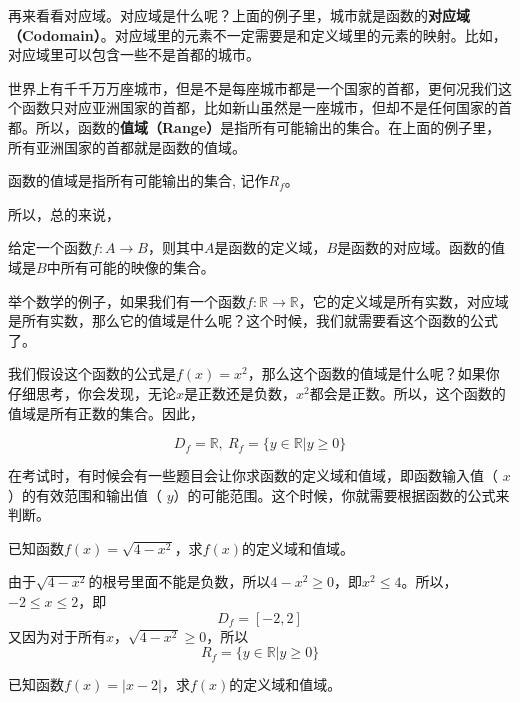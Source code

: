 \documentclass[UTF8]{ctexart}
\makeatletter
\newenvironment{cequation}{
    \makeatletter
    \setbool{@fleqn}{false}
    \makeatother
    \begin{equation*}
        }{\end{equation*}}
\makeatother
\begin{document}
再来看看对应域。对应域是什么呢？上面的例子里，城市就是函数的\textbf{对应域（Codomain）}。对应域里的元素不一定需要是和定义域里的元素的映射。比如，对应域里可以包含一些不是首都的城市。

世界上有千千万万座城市，但是不是每座城市都是一个国家的首都，更何况我们这个函数只对应亚洲国家的首都，比如新山虽然是一座城市，但却不是任何国家的首都。所以，函数的\textbf{值域（Range）}是指所有可能输出的集合。在上面的例子里，所有亚洲国家的首都就是函数的值域。

\begin{info}[值域]
    函数的值域是指所有可能输出的集合, 记作$R_f$。
\end{info}

所以，总的来说，
\begin{info}
    给定一个函数$f: A \to B$，则其中$A$是函数的定义域，$B$是函数的对应域。函数的值域是$B$中所有可能的映像的集合。
\end{info}

举个数学的例子，如果我们有一个函数$f: \mathbb{R} \to \mathbb{R}$，它的定义域是所有实数，对应域是所有实数，那么它的值域是什么呢？这个时候，我们就需要看这个函数的公式了。

我们假设这个函数的公式是$f(x) = x^2$，那么这个函数的值域是什么呢？如果你仔细思考，你会发现，无论$x$是正数还是负数，$x^2$都会是正数。所以，这个函数的值域是所有正数的集合。因此，

\vspace{-0.5cm}
\begin{cequation}
    D_f = \mathbb{R},\ R_f = \{y \in \mathbb{R} | y \geq 0\}
\end{cequation}

在考试时，有时候会有一些题目会让你求函数的定义域和值域，即函数输入值（ $x$）的有效范围和输出值（ $y$）的可能范围。这个时候，你就需要根据函数的公式来判断。

\begin{question}[（平方根函数）]
    已知函数$f(x) = \sqrt{4 - x^2}$，求$f(x)$的定义域和值域。
\end{question}

\begin{solution}
    由于$\sqrt{4 - x^2}$的根号里面不能是负数，所以$4 - x^2 \geq 0$，即$x^2 \leq 4$。所以，$-2 \leq x \leq 2$，即
    \[
        D_f = [-2, 2]
    \]
    又因为对于所有$x$，$\sqrt{4 - x^2} \geq 0$，所以
    \[
        R_f = \{y \in \mathbb{R} | y \geq 0\}
    \]
\end{solution}

\begin{question}[（绝对值函数）]
    已知函数$f(x) = |x - 2|$，求$f(x)$的定义域和值域。
\end{question}
\end{document}
